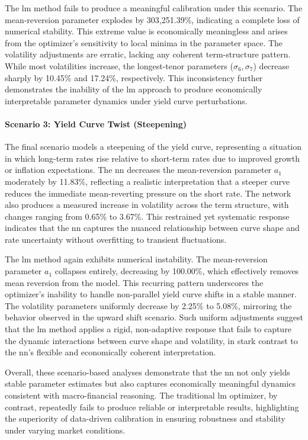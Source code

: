 The \ac{lm} method fails to produce a meaningful calibration under this scenario. The mean-reversion parameter explodes by 303,251.39\%, indicating a complete loss of numerical stability. This extreme value is economically meaningless and arises from the optimizer's sensitivity to local minima in the parameter space. The volatility adjustments are erratic, lacking any coherent term-structure pattern. While most volatilities increase, the longest-tenor parameters (\( \sigma_6, \sigma_7 \)) decrease sharply by 10.45\% and 17.24\%, respectively. This inconsistency further demonstrates the inability of the \ac{lm} approach to produce economically interpretable parameter dynamics under yield curve perturbations.

\paragraph{Scenario 3: Yield Curve Twist (Steepening)}
The final scenario models a steepening of the yield curve, representing a situation in which long-term rates rise relative to short-term rates due to improved growth or inflation expectations. The \ac{nn} decreases the mean-reversion parameter \( a_1 \) moderately by 11.83\%, reflecting a realistic interpretation that a steeper curve reduces the immediate mean-reverting pressure on the short rate. The network also produces a measured increase in volatility across the term structure, with changes ranging from 0.65\% to 3.67\%. This restrained yet systematic response indicates that the \ac{nn} captures the nuanced relationship between curve shape and rate uncertainty without overfitting to transient fluctuations.

The \ac{lm} method again exhibits numerical instability. The mean-reversion parameter \( a_1 \) collapses entirely, decreasing by 100.00\%, which effectively removes mean reversion from the model. This recurring pattern underscores the optimizer's inability to handle non-parallel yield curve shifts in a stable manner. The volatility parameters uniformly decrease by 2.25\% to 5.08\%, mirroring the behavior observed in the upward shift scenario. Such uniform adjustments suggest that the \ac{lm} method applies a rigid, non-adaptive response that fails to capture the dynamic interactions between curve shape and volatility, in stark contrast to the \ac{nn}'s flexible and economically coherent interpretation.

Overall, these scenario-based analyses demonstrate that the \ac{nn} not only yields stable parameter estimates but also captures economically meaningful dynamics consistent with macro-financial reasoning. The traditional \ac{lm} optimizer, by contrast, repeatedly fails to produce reliable or interpretable results, highlighting the superiority of data-driven calibration in ensuring robustness and stability under varying market conditions.

